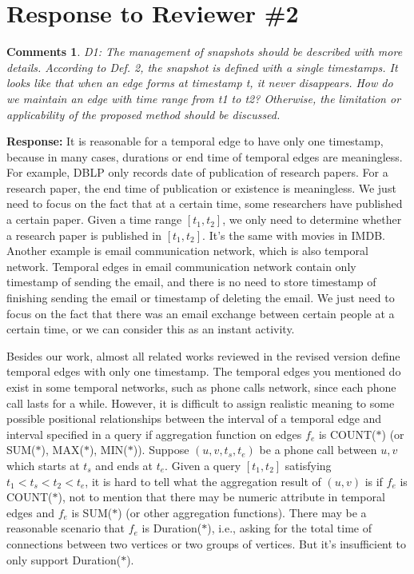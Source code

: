 \documentclass{article}
\newtheorem{Comments}{\textbf{Comments}}
\begin{document}
\section{Response to Reviewer \#2}
\setcounter{Comments}{0}
\begin{Comments}
D1: The management of snapshots should be described with more details. According to Def. 2, the snapshot is defined with a single timestamps. It looks like that when an edge forms at timestamp t, it never disappears. How do we maintain an edge with time range from t1 to t2? Otherwise, the limitation or applicability of the proposed method should be discussed.
\end{Comments}
\noindent \textbf{Response:} It is reasonable for a temporal edge to have only one timestamp, because in many cases, durations or end time of temporal edges are meaningless. For example, DBLP only records date of publication of research papers. For a research paper, the end time of publication or existence is meaningless. We just need to focus on the fact that at a certain time, some researchers have published a certain paper. Given a time range $ [t_1,t_2] $, we only need to determine whether a research paper is published in $ [t_1,t_2] $. It's the same with movies in IMDB. Another example is email communication network, which is also temporal network. Temporal edges in email communication network contain only timestamp of sending the email, and there is no need to store timestamp of finishing sending the email or timestamp of deleting the email. We just need to focus on the fact that there was an email exchange between certain people at a certain time, or we can consider this as an instant activity.

Besides our work, almost all related works reviewed in the revised version define temporal edges with only one timestamp. The temporal edges you mentioned do exist in some temporal networks, such as phone calls network, since each phone call lasts for a while. However, it is difficult to assign realistic meaning to some possible positional relationships between the interval of a temporal edge and interval specified in a query if aggregation function on edges $ f_e $ is COUNT($\ast$) (or SUM($\ast$), MAX($\ast$), MIN($\ast$)). Suppose $ (u,v,t_s,t_e) $ be a phone call between $ u,v $ which starts at $ t_s $ and ends at $ t_e $. Given a query $ [t_1,t_2] $ satisfying $ t_1<t_s<t_2<t_e $, it is hard to tell what the aggregation result of $ (u,v) $ is if $ f_e $ is COUNT($\ast$), not to mention that there may be numeric attribute in temporal edges and $ f_e $ is SUM($\ast$) (or other aggregation functions). There may be a reasonable scenario that $ f_e $ is Duration($\ast$), i.e., asking for the total time of connections between two vertices or two groups of vertices. But it's insufficient to only support Duration($\ast$).
\end{document}
